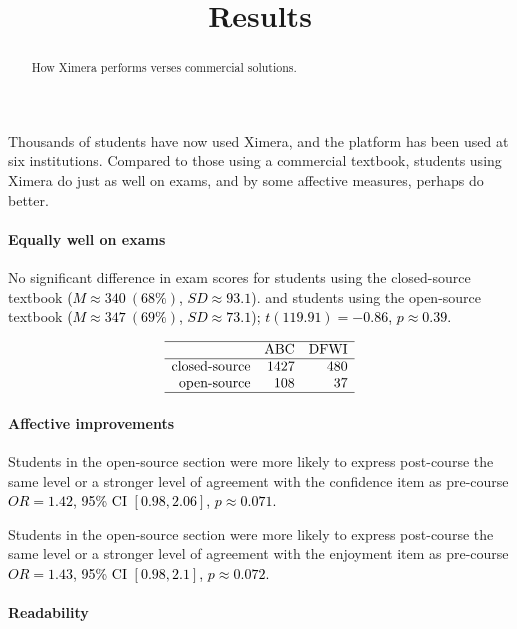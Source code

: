 \documentclass{ximera}
\title{Results}
\begin{document}
\begin{abstract}
  How Ximera performs verses commercial solutions.
\end{abstract}
\maketitle

Thousands of students have now used Ximera, and the platform has been
used at six institutions.  Compared to those using a commercial
textbook, students using Ximera do just as well on exams, and by some
affective measures, perhaps do better.

\paragraph{Equally well on exams}
    
No significant difference in exam scores for students using the
closed-source textbook \textcolor{black}{(\(M \approx 340~(68\%)\),
  \(SD \approx 93.1\))}.  and students using the open-source textbook
\textcolor{black}{(\(M \approx 347~(69\%)\), \(SD \approx 73.1\));}
\textcolor{black}{\(t( 119.91 ) = -0.86\), \(p\approx 0.39\).}



\[
  \begin{array}{rrr}
    \hline
    & \text{ABC} & \text{DFWI} \\ 
    \hline
    \text{closed-source} & 1427 & 480 \\ 
    \text{open-source} & 108 &  37 \\ 
    \hline
  \end{array}
\]

\paragraph{Affective improvements}

Students in the open-source section were more likely to express
post-course the same level or a stronger level of agreement with the
confidence item as pre-course \textcolor{black}{\(OR = 1.42\), 95\% CI
  \([ 0.98 , 2.06 ]\), \(p\approx 0.071\).}

Students in the open-source section were more likely to express
post-course the same level or a stronger level of agreement with the
enjoyment item as pre-course \textcolor{black}{\(OR = 1.43\), 95\% CI
  \([ 0.98 , 2.1 ]\), \(p\approx 0.072\).}

\paragraph{Readability}
\end{document}
